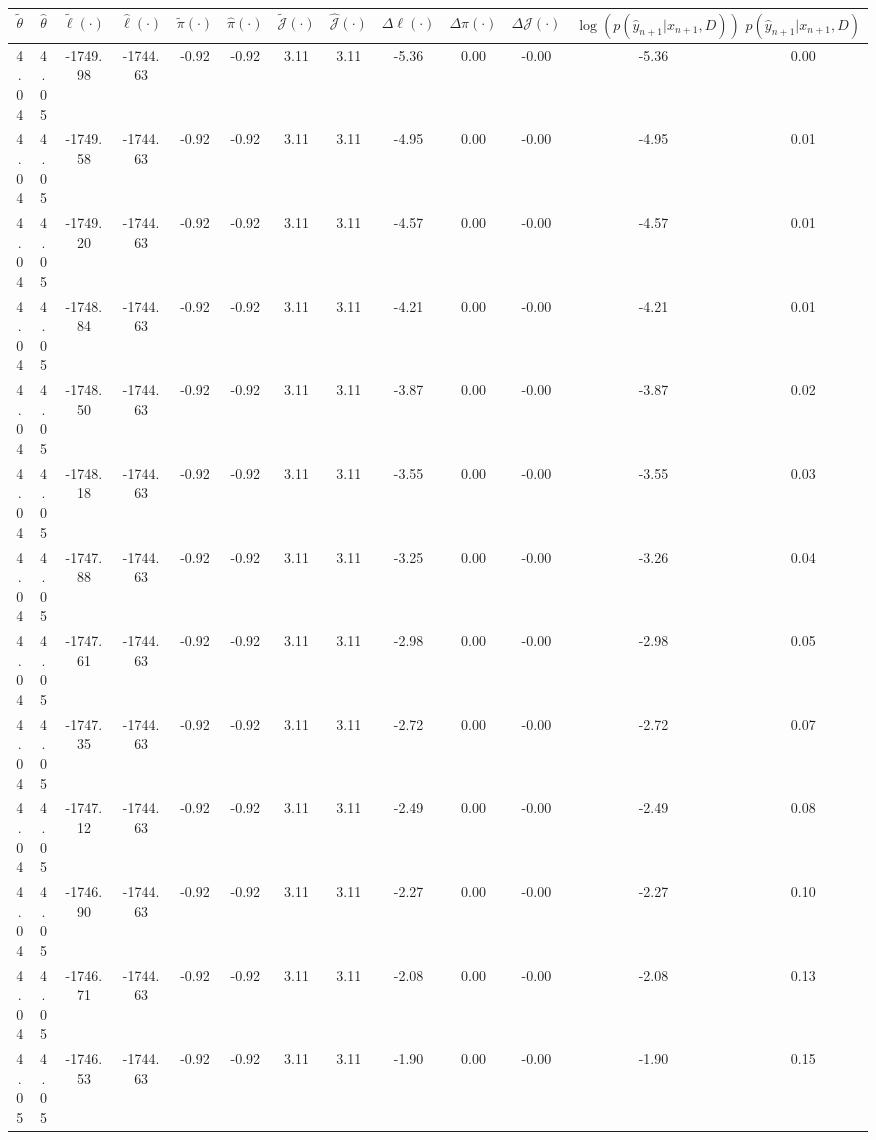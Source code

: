 \begin{table}[htbp]
        \centering
        \tiny
        \begin{adjustbox}{angle=90}
            \begin{tabular}{|c|c|c|c|c|c|c|c|c|c|c|c|c|}
                \hline
                 $\tilde{\theta}$ & $\hat{\theta}$ & $\tilde{\ell}(\cdot)$ & $\hat{\ell}(\cdot)$ & $\tilde{\pi}(\cdot)$ & $\hat{\pi}(\cdot)$ & $\tilde{\mathcal{J}}(\cdot)$ & $\hat{\mathcal{J}}(\cdot)$ & $\Delta \ell(\cdot)$ & $\Delta \pi(\cdot)$ & $\Delta \mathcal{J}(\cdot)$ & $\log(p(\hat{y}_{n+1}|x_{n+1}, D))$ & $p(\hat{y}_{n+1}|x_{n+1}, D)$ \\
                \hline
                 4.04 & 4.05 & -1749.98 & -1744.63 & -0.92 & -0.92 & 3.11 & 3.11 & -5.36 & 0.00 & -0.00 & -5.36 & 0.00\\ \hline
 4.04 & 4.05 & -1749.58 & -1744.63 & -0.92 & -0.92 & 3.11 & 3.11 & -4.95 & 0.00 & -0.00 & -4.95 & 0.01\\ \hline
 4.04 & 4.05 & -1749.20 & -1744.63 & -0.92 & -0.92 & 3.11 & 3.11 & -4.57 & 0.00 & -0.00 & -4.57 & 0.01\\ \hline
 4.04 & 4.05 & -1748.84 & -1744.63 & -0.92 & -0.92 & 3.11 & 3.11 & -4.21 & 0.00 & -0.00 & -4.21 & 0.01\\ \hline
 4.04 & 4.05 & -1748.50 & -1744.63 & -0.92 & -0.92 & 3.11 & 3.11 & -3.87 & 0.00 & -0.00 & -3.87 & 0.02\\ \hline
 4.04 & 4.05 & -1748.18 & -1744.63 & -0.92 & -0.92 & 3.11 & 3.11 & -3.55 & 0.00 & -0.00 & -3.55 & 0.03\\ \hline
 4.04 & 4.05 & -1747.88 & -1744.63 & -0.92 & -0.92 & 3.11 & 3.11 & -3.25 & 0.00 & -0.00 & -3.26 & 0.04\\ \hline
 4.04 & 4.05 & -1747.61 & -1744.63 & -0.92 & -0.92 & 3.11 & 3.11 & -2.98 & 0.00 & -0.00 & -2.98 & 0.05\\ \hline
 4.04 & 4.05 & -1747.35 & -1744.63 & -0.92 & -0.92 & 3.11 & 3.11 & -2.72 & 0.00 & -0.00 & -2.72 & 0.07\\ \hline
 4.04 & 4.05 & -1747.12 & -1744.63 & -0.92 & -0.92 & 3.11 & 3.11 & -2.49 & 0.00 & -0.00 & -2.49 & 0.08\\ \hline
 4.04 & 4.05 & -1746.90 & -1744.63 & -0.92 & -0.92 & 3.11 & 3.11 & -2.27 & 0.00 & -0.00 & -2.27 & 0.10\\ \hline
 4.04 & 4.05 & -1746.71 & -1744.63 & -0.92 & -0.92 & 3.11 & 3.11 & -2.08 & 0.00 & -0.00 & -2.08 & 0.13\\ \hline
 4.05 & 4.05 & -1746.53 & -1744.63 & -0.92 & -0.92 & 3.11 & 3.11 & -1.90 & 0.00 & -0.00 & -1.90 & 0.15\\ \hline

\end{tabular}
\end{adjustbox}
\end{table}
